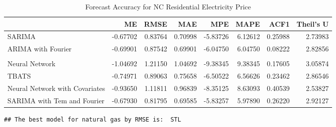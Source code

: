 \documentclass[
]{article}
\begin{document}
\begin{table}[!h]

\caption{\label{tab:unnamed-chunk-18}Forecast Accuracy for NC Residential Electricity Price}
\centering
\begin{tabular}[t]{l|r|r|r|r|r|r|r}
\hline
  & ME & RMSE & MAE & MPE & MAPE & ACF1 & Theil's U\\
\hline
SARIMA & -0.67702 & 0.83764 & 0.70998 & -5.83726 & 6.12612 & 0.25988 & 2.73983\\
\hline
ARIMA with Fourier & -0.69901 & 0.87542 & 0.69901 & -6.04750 & 6.04750 & 0.08222 & 2.82856\\
\hline
\cellcolor{red}{STL} & \cellcolor{red}{-0.58551} & \cellcolor{red}{0.76708} & \cellcolor{red}{0.63447} & \cellcolor{red}{-5.01390} & \cellcolor{red}{5.43949} & \cellcolor{red}{0.25835} & \cellcolor{red}{2.36056}\\
\hline
Neural Network & -1.04692 & 1.21150 & 1.04692 & -9.38345 & 9.38345 & 0.17605 & 3.05874\\
\hline
TBATS & -0.74971 & 0.89063 & 0.75658 & -6.50522 & 6.56626 & 0.23462 & 2.86546\\
\hline
Neural Network with Covariates & -0.93650 & 1.11811 & 0.96839 & -8.35125 & 8.63093 & 0.40539 & 2.53827\\
\hline
SARIMA with Tem and Fourier & -0.67930 & 0.81795 & 0.69585 & -5.83257 & 5.97890 & 0.26220 & 2.92127\\
\hline
\end{tabular}
\end{table}

\begin{verbatim}
## The best model for natural gas by RMSE is:  STL
\end{verbatim}
\end{document}
